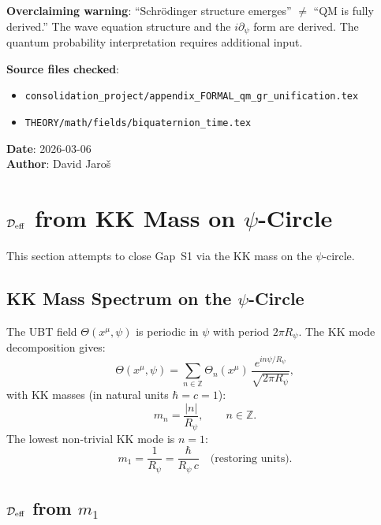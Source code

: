 \documentclass[12pt]{article}
\theoremstyle{definition}
\theoremstyle{remark}
\begin{document}
\textbf{Overclaiming warning}: ``Schrödinger structure emerges'' $\neq$ ``QM is fully derived.''
The wave equation structure and the $i\partial_\psi$ form are derived.
The quantum probability interpretation requires additional input.

\noindent\textbf{Source files checked}:
\begin{itemize}
  \item \texttt{consolidation\_project/appendix\_FORMAL\_qm\_gr\_unification.tex}
  \item \texttt{THEORY/math/fields/biquaternion\_time.tex}
\end{itemize}
\noindent\textbf{Date}: 2026-03-06\\
\textbf{Author}: David Jaroš

\section{$\mathcal{D}_{\rm eff}$ from KK Mass on $\psi$-Circle}
\label{sec:deff_kk}

This section attempts to close Gap~S1 via the KK mass on the $\psi$-circle.

\subsection{KK Mass Spectrum on the $\psi$-Circle}

The UBT field $\Theta(x^\mu, \psi)$ is periodic in $\psi$ with period
$2\pi R_\psi$.  The KK mode decomposition gives:
\begin{equation}
  \Theta(x^\mu, \psi) = \sum_{n \in \mathbb{Z}} \Theta_n(x^\mu)\,
  \frac{e^{in\psi/R_\psi}}{\sqrt{2\pi R_\psi}},
\end{equation}
with KK masses (in natural units $\hbar = c = 1$):
\begin{equation}
  m_n = \frac{|n|}{R_\psi}, \qquad n \in \mathbb{Z}.
  \label{eq:kk_mass}
\end{equation}
The lowest non-trivial KK mode is $n = 1$:
\begin{equation}
  m_1 = \frac{1}{R_\psi} = \frac{\hbar}{R_\psi\,c}
        \quad \text{(restoring units)}.
  \label{eq:m1}
\end{equation}

\subsection{$\mathcal{D}_{\rm eff}$ from $m_1$}
\end{document}
